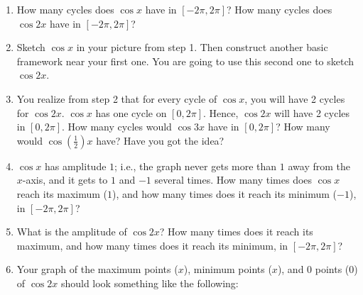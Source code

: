 \documentclass[english]{book}
\begin{document}
\begin{enumerate}
  \item[\hspace{1cm}2)] How many cycles does $\cos x$ have in $[-2\pi,2\pi]$? How many cycles does $\cos 2x$ have in $[-2\pi,2\pi]$?
  \item[\hspace{1cm}3)] Sketch $\cos x$ in your picture from step 1. Then construct another basic framework near your first one. You are going to use this second one to sketch $\cos 2x$.
  \item[\hspace{1cm}4)] You realize from step 2 that for every cycle of $\cos x$, you will have 2 cycles for $\cos 2x$. $\cos x$ has one cycle on $[0,2\pi]$. Hence, $\cos 2x$ will have 2 cycles in $[0,2\pi]$. How many cycles would $\cos 3x$ have in $[0,2\pi]$? How many would $\cos (\frac{1}{2})x$ have? Have you got the idea?
  \item[\hspace{1cm}5)] $\cos x$ has amplitude $1$; i.e., the graph never gets more than $1$ away from the $x$-axis, and it gets to $1$ and $-1$ several times. How many times does $\cos x$ reach its maximum ($1$), and how many times does it reach its minimum ($-1$), in $[-2\pi,2\pi]$?
  \item[\hspace{1cm}6)] What is the amplitude of $\cos 2x$? How many times does it reach its maximum, and how many times does it reach its minimum, in $[-2\pi,2\pi]$?
  \item[\hspace{1cm}7)] Your graph of the maximum points ($x$), minimum points ($x$), and $0$ points ($0$) of $\cos 2x$ should look something like the following:
\end{enumerate}
\end{document}
